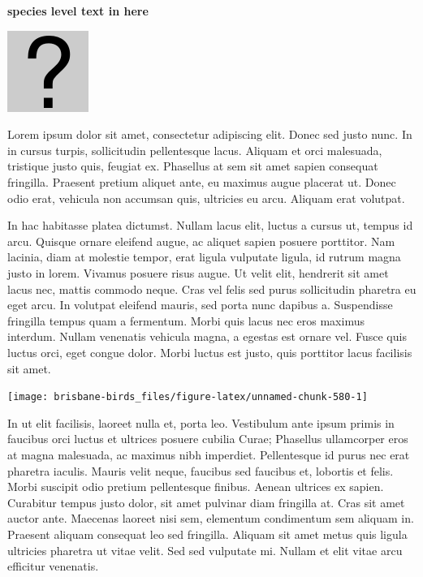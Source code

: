 \documentclass[]{book}
\let\origfigure\figure
\let\endorigfigure\endfigure
\renewenvironment{figure}[1][2] {
  \expandafter\origfigure\expandafter[H]
} {
  \endorigfigure
}
\begin{document}
\textbf{species level text in here}

\begin{figure}
\centering
\includegraphics{assets/missing.png}
\caption{No image for species}
\end{figure}

Lorem ipsum dolor sit amet, consectetur adipiscing elit. Donec sed justo
nunc. In in cursus turpis, sollicitudin pellentesque lacus. Aliquam et
orci malesuada, tristique justo quis, feugiat ex. Phasellus at sem sit
amet sapien consequat fringilla. Praesent pretium aliquet ante, eu
maximus augue placerat ut. Donec odio erat, vehicula non accumsan quis,
ultricies eu arcu. Aliquam erat volutpat.

In hac habitasse platea dictumst. Nullam lacus elit, luctus a cursus ut,
tempus id arcu. Quisque ornare eleifend augue, ac aliquet sapien posuere
porttitor. Nam lacinia, diam at molestie tempor, erat ligula vulputate
ligula, id rutrum magna justo in lorem. Vivamus posuere risus augue. Ut
velit elit, hendrerit sit amet lacus nec, mattis commodo neque. Cras vel
felis sed purus sollicitudin pharetra eu eget arcu. In volutpat eleifend
mauris, sed porta nunc dapibus a. Suspendisse fringilla tempus quam a
fermentum. Morbi quis lacus nec eros maximus interdum. Nullam venenatis
vehicula magna, a egestas est ornare vel. Fusce quis luctus orci, eget
congue dolor. Morbi luctus est justo, quis porttitor lacus facilisis sit
amet.

\begin{figure}
\texttt{[image: brisbane-birds\_files/figure-latex/unnamed-chunk-580-1]} \caption{insert figure caption}\label{fig:unnamed-chunk-580}
\end{figure}

In ut elit facilisis, laoreet nulla et, porta leo. Vestibulum ante ipsum
primis in faucibus orci luctus et ultrices posuere cubilia Curae;
Phasellus ullamcorper eros at magna malesuada, ac maximus nibh
imperdiet. Pellentesque id purus nec erat pharetra iaculis. Mauris velit
neque, faucibus sed faucibus et, lobortis et felis. Morbi suscipit odio
pretium pellentesque finibus. Aenean ultrices ex sapien. Curabitur
tempus justo dolor, sit amet pulvinar diam fringilla at. Cras sit amet
auctor ante. Maecenas laoreet nisi sem, elementum condimentum sem
aliquam in. Praesent aliquam consequat leo sed fringilla. Aliquam sit
amet metus quis ligula ultricies pharetra ut vitae velit. Sed sed
vulputate mi. Nullam et elit vitae arcu efficitur venenatis.
\end{document}
